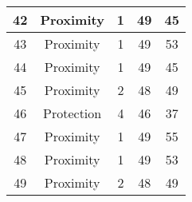 \documentclass[results.tex]{subfiles}
\begin{document}
\begin{center}
\begin{tabular}{| c || c | c | c | c |}
            \hline
            42                      & Proximity                    & 1                      & 49                      & 45                   \\
            \hline
            43                      & Proximity                    & 1                      & 49                      & 53                   \\
            \hline
            44                      & Proximity                    & 1                      & 49                      & 45                   \\
            \hline
            45                      & Proximity                    & 2                      & 48                      & 49                   \\
            \hline
            46                      & Protection                   & 4                      & 46                      & 37                   \\
            \hline
            47                      & Proximity                    & 1                      & 49                      & 55                   \\
            \hline
            48                      & Proximity                    & 1                      & 49                      & 53                   \\
            \hline
            49                      & Proximity                    & 2                      & 48                      & 49                   \\
            \hline
        \end{tabular}
    \end{center}
\end{document}

